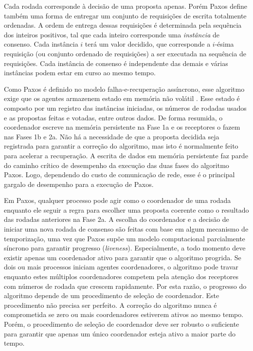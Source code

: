 Cada rodada corresponde à decisão de uma proposta apenas. Porém Paxos define também uma
forma de entregar um conjunto de requisições de escrita totalmente ordenadas. A ordem de
entrega dessas requisições é determinada pela sequência dos inteiros positivos, tal que
cada inteiro corresponde uma \emph{instância} de consenso. Cada instância $i$ terá um
valor decidido, que corresponde a $i$-ésima requisição (ou conjunto ordenado de
requisições) a ser executada na sequência de requisições. Cada instância de consenso é
independente das demais e várias instâncias podem estar em curso ao mesmo tempo.

Como Paxos é definido no modelo falha-e-recuperação assíncrono, esse algoritmo exige que
os agentes armazenem estado em memória não volátil \cite{lamport06a}. Esse estado é
composto por um registro das instâncias iniciadas, os números de rodadas usados e as
propostas feitas e votadas, entre outros dados. De forma resumida, o coordenador escreve
na memória persistente na Fase 1a e os receptores o fazem nas Fases 1b e 2a. Não há a
necessidade de que a proposta decidida seja registrada para garantir a correção do
algoritmo, mas isto é normalmente feito para acelerar a recuperação. A escrita de dados em
memória persistente faz parde do caminho crítico de desempenho da execução das duas fases
do algoritmo Paxos. Logo, dependendo do custo de comunicação de rede, esse é o principal
gargalo de desempenho para a execução de Paxos.

Em Paxos, qualquer processo pode agir como o coordenador de uma rodada enquanto ele seguir
a regra para escolher uma proposta coerente como o resultado das rodadas anteriores na
Fase 2a. A escolha do coordenador e a decisão de iniciar uma nova rodada de consenso são
feitas com base em algum mecanismo de temporização, uma vez que Paxos supõe um modelo
computacional parcialmente síncrono para garantir progresso (\emph{liveness}).
Especialmente, a todo momento deve existir apenas um coordenador ativo para garantir que o
algoritmo progrida. Se dois ou mais processos iniciam agentes coordenadores, o algoritmo
pode travar enquanto estes múltiplos coordenadores competem pela atenção dos receptores
com números de rodada que crescem rapidamente. Por esta razão, o progresso do algoritmo
depende de um procedimento de seleção de coordenador. Este procedimento não precisa ser
perfeito. A correção do algoritmo nunca é comprometida se zero ou mais coordenadores
estiverem ativos ao mesmo tempo. Porém, o procedimento de seleção de coordenador deve ser
robusto o suficiente para garantir que apenas um único coordenador esteja ativo a maior
parte do tempo.

